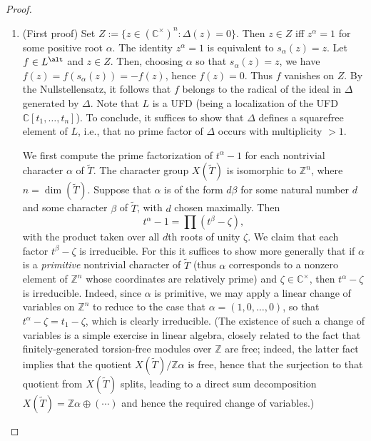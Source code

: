\documentclass[reqno]{amsart} 
\begin{document}
\begin{proof}
\begin{enumerate}
\begin{enumerate}
    \item (First proof) Set $Z := \{z \in (\mathbb{C}^\times)^n : \Delta(z) = 0 \}$.  Then $z \in Z$ iff $z^\alpha = 1$ for some positive root $\alpha$.  The identity $z^\alpha = 1$ is equivalent to $s_\alpha(z) = z$.  Let $f \in L^{\alt}$ and $z \in Z$.  Then, choosing $\alpha$ so that $s_\alpha(z) = z$, we have $f(z) = f(s_\alpha(z)) = - f(z)$, hence $f(z) = 0$.  Thus $f$ vanishes on $Z$.  By the Nullstellensatz, it follows that $f$ belongs to the radical of the ideal in $\Delta$ generated by $\Delta$.  Note that $L$ is a UFD (being a localization of the UFD $\mathbb{C}[t_1,\dotsc,t_n]$).  To conclude, it suffices to show that $\Delta$ defines a squarefree element of $L$, i.e., that no prime factor of $\Delta$ occurs with multiplicity $> 1$.

      We first compute the prime factorization of $t^\alpha - 1$ for each nontrivial character $\alpha$ of $\tilde{T}$.  The character group $X(\tilde{T})$ is isomorphic to $\mathbb{Z}^n$, where $n = \dim(\tilde{T})$.  Suppose that $\alpha$ is of the form $d \beta$ for some natural number $d$ and some character $\beta$ of $\tilde{T}$, with $d$ chosen maximally.  Then
      \begin{equation}\label{eq:prime-factorization-t-alpha-minus-one}
        t^\alpha - 1 = \prod (t^\beta - \zeta),
      \end{equation}
      with the product taken over all $d$th roots of unity $\zeta$.  We claim that each factor $t^\beta - \zeta$ is irreducible.  For this it suffices to show more generally that if $\alpha$ is a \emph{primitive} nontrivial character of $\tilde{T}$ (thus $\alpha$ corresponds to a nonzero element of $\mathbb{Z}^n$ whose coordinates are relatively prime) and $\zeta \in \mathbb{C}^\times$, then $t^\alpha - \zeta$ is irreducible.  Indeed, since $\alpha$ is primitive, we may apply a linear change of variables on $\mathbb{Z}^n$ to reduce to the case that $\alpha = (1,0,\dotsc,0)$, so that $t^\alpha - \zeta = t_1 - \zeta$, which is clearly irreducible.  (The existence of such a change of variables is a simple exercise in linear algebra, closely related to the fact that finitely-generated torsion-free modules over $\mathbb{Z}$ are free; indeed, the latter fact implies that the quotient $X(\tilde{T})/\mathbb{Z} \alpha$ is free, hence that the surjection to that quotient from $X(\tilde{T})$ splits, leading to a direct sum decomposition $X(\tilde{T}) = \mathbb{Z} \alpha \oplus (\dotsb)$ and hence the required change of variables.)
      


\end{enumerate}
\end{enumerate}
\end{proof}
\end{document}
